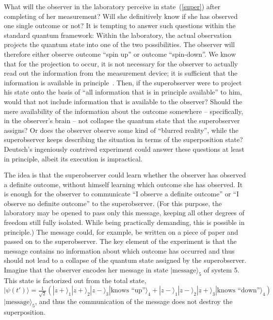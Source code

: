 \documentclass[12pt,a4]{article}
\begin{document}
What will the observer in the laboratory perceive in state~(\ref{super}) after completing of her measurement? Will she definitively know if she has observed one single outcome or not? It is tempting to answer such questions within the standard quantum framework: Within the laboratory, the actual observation projects the quantum state into one of the two possibilities. The observer will therefore either observe outcome ``spin up'' or outcome ``spin-down''. We know that for the projection to occur, it is not necessary for the observer to actually read out the information from the measurement device; it is sufficient that the information is available in principle~\cite{mandel}. Then, if the superobserver were to project his state onto the basis of ``all information that is in principle available'' to him, would that not include information that is available to the observer? Should the mere availability of the information about the outcome somewhere -- specifically, in the observer's brain -- not collapse the quantum state that the superobserver assigns? Or does the observer observe some kind of ``blurred reality'', while the superobserver keeps describing the situation in terms of the superposition state? Deutsch's ingeniously contrived experiment could answer these questions at least in principle, albeit its execution is impractical. 

The idea is that the superobserver could learn whether the observer has observed a definite outcome, without himself learning which outcome she has observed. It is enough for the observer to communicate ``I observe a definite outcome'' or ``I observe no definite outcome'' to the superobserver. (For this purpose, the laboratory may be opened to pass only this message, keeping all other degrees of freedom still fully isolated. While being practically demanding, this is possible in principle.) The message could, for example, be written on a piece of paper and passed on to the superobserver. The key element of the experiment is that the message contains no information about which outcome has occurred and thus should not lead to a collapse of the quantum state assigned by the superobserver. Imagine that the observer encodes her message in state $|\mbox{message}\rangle_5$ of system 5. This state is factorized out from the total state, $|\psi(t')\rangle = \frac{1}{\sqrt{2}} (|z+\rangle_1|z+\rangle_2|z-\rangle_3|\mbox{knows ``up''}\rangle_4 +|z-\rangle_1|z-\rangle_2|z+\rangle_3 |\mbox{knows ``down''}\rangle_4)$ $|\mbox{message}\rangle_5$, and thus the communication of the message does not destroy the superposition.
\end{document}
